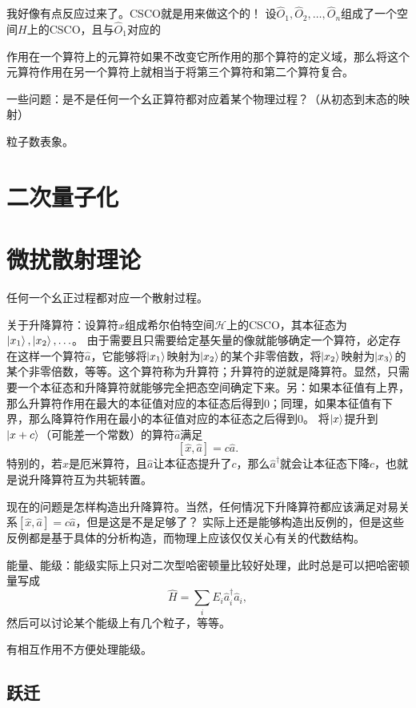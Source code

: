 \documentclass[UTF8, a4paper]{ctexart}
\begin{document}
我好像有点反应过来了。CSCO就是用来做这个的！
设$\hat{O}_1, \hat{O}_2, \ldots, \hat{O}_n$组成了一个空间$H$上的CSCO，且与$\hat{O}_1$对应的

作用在一个算符上的元算符如果不改变它所作用的那个算符的定义域，那么将这个元算符作用在另一个算符上就相当于将第三个算符和第二个算符复合。

一些问题：是不是任何一个幺正算符都对应着某个物理过程？（从初态到末态的映射）

粒子数表象。

\section{二次量子化}

\section{微扰散射理论}

任何一个幺正过程都对应一个散射过程。

关于升降算符：设算符$\hat{x}$组成希尔伯特空间$\mathcal{H}$上的CSCO，其本征态为$\ket{x_1}, \ket{x_2}, \ldots$。
由于需要且只需要给定基矢量的像就能够确定一个算符，必定存在这样一个算符$\hat{a}$，它能够将$\ket{x_1}$映射为$\ket{x_2}$的某个非零倍数，将$\ket{x_2}$映射为$\ket{x_3}$的某个非零倍数，等等。这个算符称为升算符；升算符的逆就是降算符。显然，只需要一个本征态和升降算符就能够完全把态空间确定下来。另：如果本征值有上界，那么升算符作用在最大的本征值对应的本征态后得到$0$；同理，如果本征值有下界，那么降算符作用在最小的本征值对应的本征态之后得到$0$。
将$\ket{x}$提升到$\ket{x+c}$（可能差一个常数）的算符$\hat{a}$满足
\[
    [\hat{x}, \hat{a}] = c \hat{a}.
\]
特别的，若$\hat{x}$是厄米算符，且$\hat{a}$让本征态提升了$c$，那么$\hat{a}^\dagger$就会让本征态下降$c$，也就是说升降算符互为共轭转置。

现在的问题是怎样构造出升降算符。当然，任何情况下升降算符都应该满足对易关系$[\hat{x}, \hat{a}] = c \hat{a}$，但是这是不是足够了？
实际上还是能够构造出反例的，但是这些反例都是基于具体的分析构造，而物理上应该仅仅关心有关的代数结构。

能量、能级：能级实际上只对二次型哈密顿量比较好处理，此时总是可以把哈密顿量写成
\[
    \hat{H} = \sum_i E_i \hat{a}^\dagger_i \hat{a}_i,
\]
然后可以讨论某个能级上有几个粒子，等等。

有相互作用不方便处理能级。

\subsection{跃迁}
\end{document}
